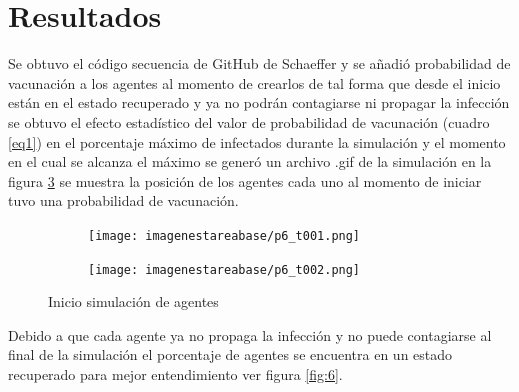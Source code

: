 \documentclass[a4paper]{article}
\begin{document}
\section{Resultados}
\justify
Se obtuvo el código secuencia de GitHub de Schaeffer \cite{p3gitdr} y se añadió probabilidad de vacunación a los agentes al momento de crearlos de tal forma que desde el inicio están en el estado recuperado y ya no podrán contagiarse ni propagar la infección se obtuvo el efecto estadístico del valor de probabilidad de vacunación (cuadro \ref{eq1}) en el porcentaje máximo de infectados durante la simulación y el momento en el cual se alcanza el máximo se generó un archivo .gif \cite{gif} de la simulación en la figura \ref{fig:5} se muestra la posición de los agentes cada uno al momento de iniciar tuvo una probabilidad de vacunación.
\bigskip
\begin{figure}[h!]
    \centering
\begin{subfigure}[b]{0.4\linewidth}
\texttt{[image: imagenestareabase/p6\_t001.png]}
\caption{}
\label{c4}
\end{subfigure}
\begin{subfigure}[b]{0.4\linewidth}
\texttt{[image: imagenestareabase/p6\_t002.png]}
\caption{}
\label{c5}
\end{subfigure}
\caption{Inicio simulación de agentes}
    \label{fig:5}
\end{figure}

\justify Debido a que cada agente ya no propaga la infección y no puede contagiarse al final de la simulación el porcentaje de agentes se encuentra en un estado recuperado para mejor entendimiento ver figura \ref{fig:6}.
\end{document}
